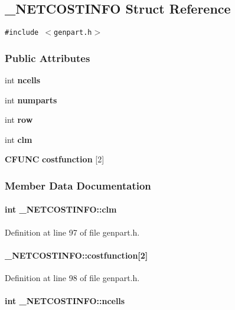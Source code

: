 \subsection{\_\-NETCOSTINFO  Struct Reference}
\label{_NETCOSTINFO}
{\tt \#include $<$genpart.h$>$}

\subsubsection*{Public Attributes}
\begin{CompactItemize}
\item 
int {\bf ncells}
\item 
int {\bf numparts}
\item 
int {\bf row}
\item 
int {\bf clm}
\item 
{\bf CFUNC} {\bf costfunction} [2]
\end{CompactItemize}


\subsubsection{Member Data Documentation}
\label{_NETCOSTINFO_m3}
\paragraph{\setlength{\rightskip}{0pt plus 5cm}int \_\-NETCOSTINFO::clm}\hfill



Definition at line 97 of file genpart.h.\label{_NETCOSTINFO_m4}
\paragraph{ \_\-NETCOSTINFO::costfunction[2]}\hfill



Definition at line 98 of file genpart.h.\label{_NETCOSTINFO_m0}
\paragraph{\setlength{\rightskip}{0pt plus 5cm}int \_\-NETCOSTINFO::ncells}\hfill



